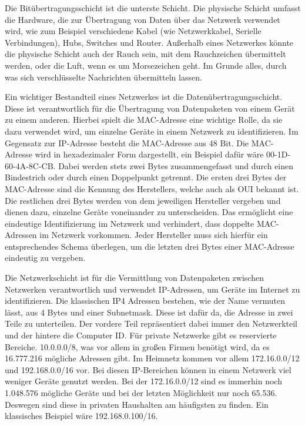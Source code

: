 \begin{compactenum}
\item Die Bitübertragungsschicht ist die unterste Schicht. Die physische Schicht umfasst die Hardware, die zur Übertragung von Daten über das Netzwerk verwendet wird, wie zum Beispiel verschiedene Kabel (wie Netzwerkkabel, Serielle Verbindungen), Hubs, Switches und Router. Außerhalb eines Netzwerkes könnte die physische Schicht auch der Rauch sein, mit dem Rauchzeichen übermittelt werden, oder die Luft, wenn es um Morsezeichen geht. Im Grunde alles, durch was sich verschlüsselte Nachrichten übermitteln lassen.
\item Ein wichtiger Bestandteil eines Netzwerkes ist die Datenübertragungsschicht. Diese ist verantwortlich für die Übertragung von Datenpaketen von einem Gerät zu einem anderen. Hierbei spielt die MAC-Adresse eine wichtige Rolle, da sie dazu verwendet wird, um einzelne Geräte in einem Netzwerk zu identifizieren. Im Gegensatz zur IP-Adresse besteht die MAC-Adresse aus 48 Bit. Die MAC-Adresse wird in hexadezimaler Form dargestellt, ein Beispiel dafür wäre 00-1D-60-4A-8C-CB. Dabei werden stets zwei Bytes zusammengefasst und durch einen Bindestrich oder durch einen Doppelpunkt getrennt. Die ersten drei Bytes der MAC-Adresse sind die Kennung des Herstellers, welche auch als \glqq OUI\grqq{} bekannt ist. Die restlichen drei Bytes werden von dem jeweiligen Hersteller vergeben und dienen dazu, einzelne Geräte voneinander zu unterscheiden. Das ermöglicht eine eindeutige Identifizierung im Netzwerk und verhindert, dass doppelte MAC-Adressen im Netzwerk vorkommen. Jeder Hersteller muss sich hierfür ein entsprechendes Schema überlegen, um die letzten drei Bytes einer MAC-Adresse eindeutig zu vergeben. \cite{wieisteineMacaufgebaut}
\item Die Netzwerkschicht ist für die Vermittlung von Datenpaketen zwischen Netzwerken verantwortlich und verwendet IP-Adressen, um Geräte im Internet zu identifizieren. \cite{ipAddress} Die klassischen IP4 Adressen bestehen, wie der Name vermuten lässt, aus 4 Bytes und einer Subnetmask. Diese ist dafür da, die Adresse in zwei Teile zu unterteilen. Der vordere Teil repräsentiert dabei immer den Netzwerkteil und der hintere die Computer ID. Für private Netzwerke gibt es reservierte Bereiche. 10.0.0.0/8, was vor allem in großen Firmen benötigt wird, da es 16.777.216 mögliche Adressen gibt. Im Heimnetz kommen vor allem 172.16.0.0/12 und 192.168.0.0/16 vor. Bei diesen IP-Bereichen können in einem Netzwerk viel weniger Geräte genutzt werden. Bei der 172.16.0.0/12 sind es immerhin noch 1.048.576 mögliche Geräte und bei der letzten Möglichkeit nur noch 65.536. Deswegen sind diese in privaten Haushalten am häufigsten zu finden. Ein klassisches Beispiel wäre 192.168.0.100/16.

\end{compactenum}
